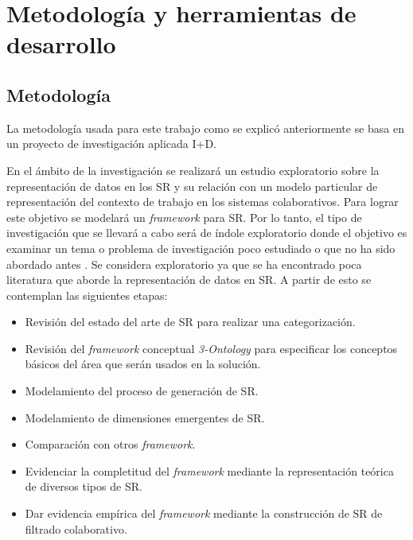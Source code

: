 \section{Metodolog\'ia y herramientas de desarrollo}

\subsection{Metodolog\'ia}

La metodología usada para este trabajo como se explicó anteriormente se basa en un proyecto de investigación aplicada I+D.

En el ámbito de la investigación se realizará un estudio exploratorio sobre la representación de datos en los SR y su relación con un modelo particular de representación del contexto de trabajo en los sistemas colaborativos. Para lograr este objetivo se modelará un \textit{framework} para SR. Por lo tanto, el tipo de investigación que se llevará a cabo será de índole exploratorio donde el objetivo es examinar  un tema o problema de investigación poco estudiado o que no ha sido abordado antes \citep{Sampieri:2005}. Se considera exploratorio ya que se ha encontrado poca literatura que aborde la representación de datos en SR. A partir de esto se contemplan las siguientes etapas:

\begin{itemize}
\item Revisión del estado del arte de SR para realizar una categorización.
\item Revisión del \textit{framework} conceptual \textit{3-Ontology} para especificar los conceptos básicos del área que serán usados en la solución.
\item Modelamiento del proceso de generación de SR.
\item Modelamiento de dimensiones emergentes de SR.
\item Comparación con otros \textit{framework}.
\item Evidenciar la completitud del \textit{framework} mediante la representación teórica de diversos tipos de SR.
\item Dar evidencia empírica del \textit{framework} mediante la construcción de SR de filtrado colaborativo.
\end{itemize}

